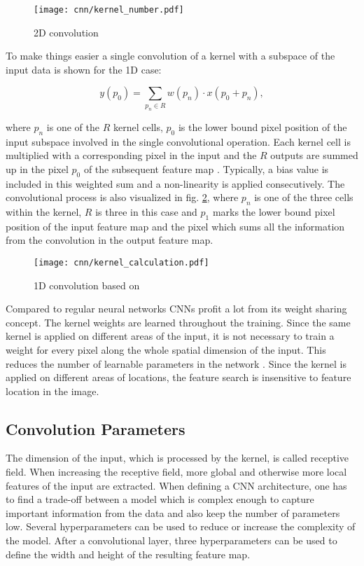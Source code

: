 \begin{figure}[H]
  \centering
  \texttt{[image: cnn/kernel\_number.pdf]}
  \caption {2D convolution}
  \label{fig:kernel_number}
\end{figure}

To make things easier a single convolution of a kernel with a subspace of the input data is shown for the 1D case:

\begin{equation}
  y(p_{0}) = \sum_{p_{n} \in R} w(p_{n}) \cdot x(p_{0} + p_{n}), 
  \label{eq:kernel}
\end{equation}

where $p_{n}$ is one of the $R$ kernel cells, $p_{0}$ is the lower bound pixel position of the input subspace involved in the single convolutional operation. Each kernel cell is multiplied with a corresponding pixel in the input and the $R$ outputs are summed up in the pixel $p_{0}$ of the subsequent feature map \cite{Dai2017}. Typically, a bias value is included in this weighted sum and a non-linearity is applied consecutively. The convolutional process is also visualized in fig. \ref{fig:kernel}, where $p_{n}$ is one of the three cells within the kernel, $R$ is three in this case and $p_{1}$ marks the lower bound pixel position of the input feature map and the pixel which sums all the information from the convolution in the output feature map.


\begin{figure}[H]
  \centering
  \texttt{[image: cnn/kernel\_calculation.pdf]}
  \caption {1D convolution based on \cite{Ganesh2019}}
  \label{fig:kernel}
\end{figure}

Compared to regular neural networks CNNs profit a lot from its weight sharing concept. The kernel weights are learned throughout the training. Since the same kernel is applied on different areas of the input, it is not necessary to train a weight for every pixel along the whole spatial dimension of the input. This reduces the number of learnable parameters in the network \cite{OShea2015}. Since the kernel is applied on different areas of locations, the feature search is insensitive to feature location in the image.

\subsection{Convolution Parameters}

The dimension of the input, which is processed by the kernel, is called receptive field. When increasing the receptive field, more global and otherwise more local features of the input are extracted. When defining a CNN architecture, one has to find a trade-off between a model which is complex enough to capture important information from the data and also keep the number of parameters low. Several hyperparameters can be used to reduce or increase the complexity of the model. After a convolutional layer, three hyperparameters can be used to define the width and height of the resulting feature map. 


